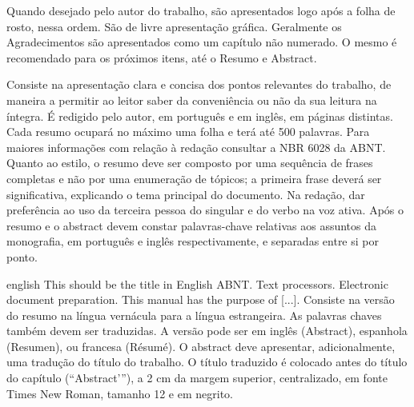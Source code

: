 \documentclass[
	oneside,
	english,brazil,				%
	mestrado,ppgc
	]
	{infufrgs}
\begin{document}
	\imprimirfolhaderosto*
	
	\imprimircip

\begin{agradecimentos}
	Quando desejado pelo autor do trabalho, são apresentados logo após a folha de rosto,
	nessa ordem. São de livre apresentação gráfica. Geralmente os Agradecimentos são
	apresentados como um capítulo não numerado. O mesmo é recomendado para os próximos
	itens, até o Resumo e Abstract.
\end{agradecimentos}

\begin{resumo}
	Consiste na apresentação clara e concisa dos pontos relevantes do trabalho, de maneira a permitir ao leitor saber da conveniência ou não da sua leitura na íntegra. É redigido pelo
	autor, em português e em inglês, em páginas distintas. Cada resumo ocupará no máximo uma
	folha e terá até 500 palavras. Para maiores informações com relação à redação consultar a NBR 6028 da ABNT. Quanto ao estilo, o resumo deve ser composto por uma sequência de
	frases completas e não por uma enumeração de tópicos; a primeira frase deverá ser
	significativa, explicando o tema principal do documento. Na redação, dar preferência ao uso
	da terceira pessoa do singular e do verbo na voz ativa. Após o resumo e o abstract devem
	constar palavras-chave relativas aos assuntos da monografia, em português e inglês
	respectivamente, e separadas entre si por ponto.
\end{resumo}

\begin{resumoestrangeiro}{english}
	{This should be the title in English}
	{ABNT. Text processors. Electronic document preparation.}
		This manual has the purpose of [...]. Consiste na versão do resumo na língua vernácula para a
	língua estrangeira. As palavras chaves também devem ser traduzidas. A versão pode ser em
	inglês (Abstract), espanhola (Resumen), ou francesa (Résumé). O abstract deve apresentar,
	adicionalmente, uma tradução do título do trabalho. O título traduzido é colocado antes do
	título do capítulo (“Abstract’”), a 2 cm da margem superior, centralizado, em fonte Times
	New Roman, tamanho 12 e em negrito.
\end{resumoestrangeiro}

\listoffigures
\cleardoublepage
\end{document}
